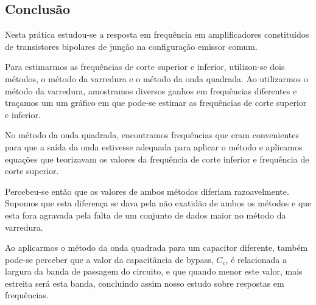 \documentclass[12pt,a4paper]{article}
\begin{document}
\subsection{Conclusão}
Nesta prática estudou-se a resposta em frequência em amplificadores constituídos 
de transistores bipolares de junção na configuração emissor comum. 

Para estimarmos as frequências de corte superior e inferior, utilizou-se dois métodos, 
o método da varredura e o método da onda quadrada. Ao utilizarmos o método da varredura,
amostramos diversos ganhos em frequências diferentes e traçamos um um gráfico 
em que pode-se estimar as frequências de corte superior e inferior. 

No método da onda quadrada, encontramos frequências que eram convenientes para que 
a saída da onda estivesse adequada para aplicar o método e aplicamos equações que 
teorizavam os valores da frequência de corte inferior e frequência de corte superior. 

Percebeu-se então que os valores de ambos métodos diferiam razoavelmente. Supomos que 
esta diferença se dava pela não exatidão de ambos os métodos e que esta fora agravada 
pela falta de um conjunto de dados maior no método da varredura. 

Ao aplicarmos o método da onda quadrada para um capacitor diferente, também pode-se perceber
que a valor da capacitância de bypass, $C_{e}$, é relacionada a largura da banda de passagem 
do circuito, e que quando menor este valor, mais estreita será esta banda, concluindo assim
nosso estudo sobre respostas em frequências.
\end{document}
